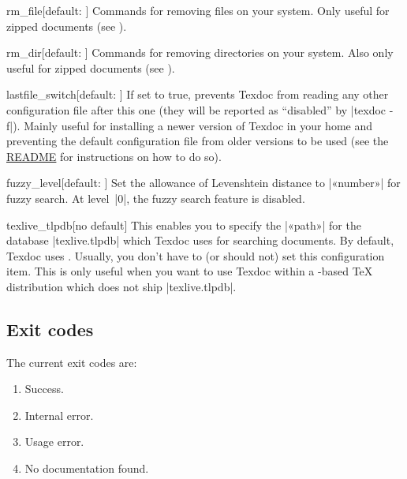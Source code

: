 \documentclass[draft]{texdoc-doc}
\begin{document}
\begin{confitem}{rm\_file}{}[default: ]
Commands for removing files on your system. Only useful for zipped documents
(see ).
\end{confitem}

\begin{confitem}{rm\_dir}{}[default: ]
Commands for removing directories on your system. Also only useful for zipped
documents (see ).
\end{confitem}

\begin{confitem}{lastfile\_switch}{}[default: ]
If set to true, prevents Texdoc from reading any other configuration file after
this one (they will be reported as ``disabled'' by |texdoc -f|). Mainly useful
for installing a newer version of Texdoc in your home and preventing the
default configuration file from older versions to be used (see the
\href{https://github.com/TeX-Live/texdoc}{README} for instructions on how to do
so).
\end{confitem}

\begin{confitem}{fuzzy\_level}{}[default: ]
Set the allowance of Levenshtein distance to |«number»| for fuzzy search. At
level~|0|, the fuzzy search feature is disabled.
\end{confitem}

\begin{confitem}{texlive\_tlpdb}{}[no default]
This enables you to specify the |«path»| for the database |texlive.tlpdb| which
Texdoc uses for searching documents. By default, Texdoc uses
. Usually, you don't have to (or should
not) set this configuration item. This is only useful when you want to use
Texdoc within a {\TL}-based {\TeX} distribution which does not ship
|texlive.tlpdb|.
\end{confitem}

\subsection{Exit codes}
\label{sec:exit}

The current exit codes are:
\begin{enumerate}[start=0]
  \item Success.
  \item Internal error.
  \item Usage error.
  \item No documentation found.
\end{enumerate}
\end{document}
